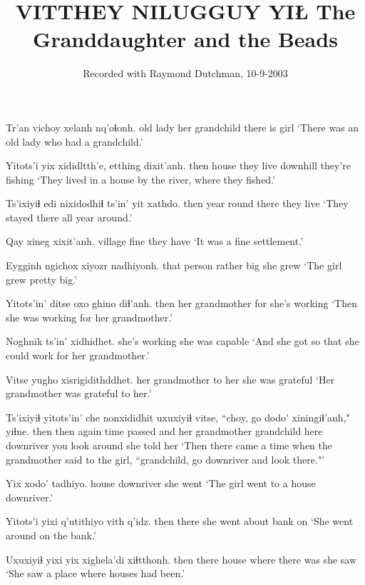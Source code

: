\documentclass[12pt]{article}
\begin{document}
\title{VITTHEY NILUGGUY YIŁ \newline The Granddaughter and the Beads}
\author{Recorded with Raymond Dutchman, 10-9-2003}
\date{}
\maketitle

\gll Tr'an vichoy xelanh nq'oɬonh.
{old lady} {her grandchild} {there is} girl
\glt `There was an old lady who had a grandchild.'
\glend

\gll Yitots'i yix xididltth'e, etthing dixit'anh.
then house {they live} downhill {they're fishing}
\glt `They lived in a house by the river, where they fished.'
\glend

\gll Ts'ixiyiɬ {edi nixidodhiɬ} ts'in' yit xathdo.
then {year round} {} there {they live}
\glt `They stayed there all year around.'
\glend

\gll Qay xineg xixit'anh.
village fine {they have}
\glt `It was a fine settlement.'
\glend

\gll Eygginh {ngichox xiyozr} nadhiyonh.
{that person} {rather big} {she grew}
\glt `The girl grew pretty big.'
\glend

\gll Yitots'in' ditse oxo {ghino diɬ'anh.} 
then {her grandmother} for {she's working} 
\glt `Then she was working for her grandmother.'
\glend

\gll Noghnik ts'in' xidhidhet.
{she's working} {} {she was capable}
\glt `And she got so that she could work for her grandmother.'
\glend

\gll Vitse yugho xisrigidithddhet.
{her grandmother} {to her} {she was grateful}
\glt `Her grandmother was grateful to her.'
\glend

\gll Ts'ixiyiɬ yitots'in' che nonxididhit uxuxiyiɬ vitse, ``choy, go dodo' xiningiɬ'anh," yiɬne.
then then again {time passed} and {her grandmother} grandchild here downriver {you look around} {she told her}
\glt `Then there came a time when the grandmother said to the girl, ``grandchild, go downriver and look there."'
\glend

\gll Yix xodo' tadhiyo.
house downriver {she went}
\glt `The girl went to a house downriver.'
\glend

\gll Yitots'i yixi q'utithiyo vith q'idz.
then there {she went about} bank on
\glt `She went around on the bank.'
\glend

\gll Uxuxiyiɬ yixi yix xighela'di xiɬtthonh.
then there house {where there was} {she saw}
\glt `She saw a place where houses had been.'
\glend
\end{document}
